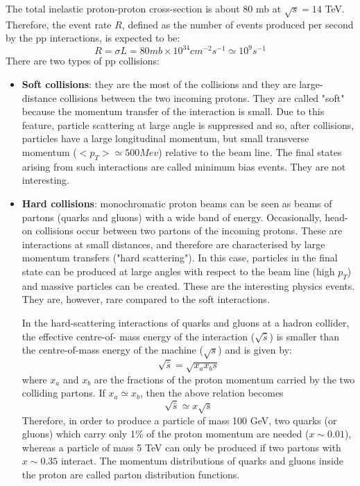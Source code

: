 \documentclass[a4paper, oneside]{book}
\begin{document}
					The total inelastic proton-proton cross-section is about 80 mb at $\sqrt{s} = 14$ TeV. \cite{LHC introduction} Therefore, the event rate $R$, defined as the number of events produced per second by the pp interactions, is expected to be:
					$$
					R = \sigma L = 80 mb\times10^{34}cm^{-2}s^{-1} \simeq 10^{9}s^{-1}
					$$
					There are two types of pp collisions:
					\begin{itemize}
						\item \textbf{Soft collisions}: 
						they are the most of the collisions and they are large-distance collisions between the two incoming protons. They are called "soft" because the momentum transfer of the interaction is small. Due to this feature, particle scattering at large angle is suppressed and so, after collisions, particles have a large longitudinal momentum, but small transverse momentum ($<p_T>\simeq500 Mev$) relative to the beam line. The final states
						arising from such interactions are called minimum bias events. They are not interesting.
						\item \textbf{Hard collisions}:
						monochromatic proton beams can be seen as beams of partons (quarks and gluons) with a wide band
						of energy. Occasionally, head-on collisions occur between two partons of the incoming protons. These are interactions at small distances, and therefore are characterised by large
						momentum transfers ("hard scattering"). In this case, particles in the final state can be produced at large angles with respect to the beam line (high $p_T$) and massive particles can be created.
						These are the interesting physics events. They are, however, rare compared to the soft interactions.
						
						In the hard-scattering interactions of quarks and gluons at a hadron collider, the effective centre-of-
						mass energy of the interaction ($\sqrt{\hat{s}}$) is smaller than the centre-of-mass energy of the machine ($\sqrt{s}$) and is given by: 
						$$ 
						\sqrt{\hat{s}} = \sqrt{x_ax_bs}
						$$
						where $x_a$ and $x_b$ are the fractions of the proton momentum carried by the two colliding partons. If $x_a \simeq x_b$, then the above relation becomes
						$$ 
						\sqrt{\hat{s}} \simeq x\sqrt{s}
						$$
						Therefore, in order to produce a particle of mass 100 GeV, two quarks (or gluons) which carry only 1\% of the proton momentum are needed ($x \sim 0.01$), whereas a particle of mass 5 TeV can only be produced if two partons with $x \sim 0.35$ interact. The momentum distributions of quarks and gluons inside the proton are called parton distribution functions. %
			\end{itemize}
\end{document}
